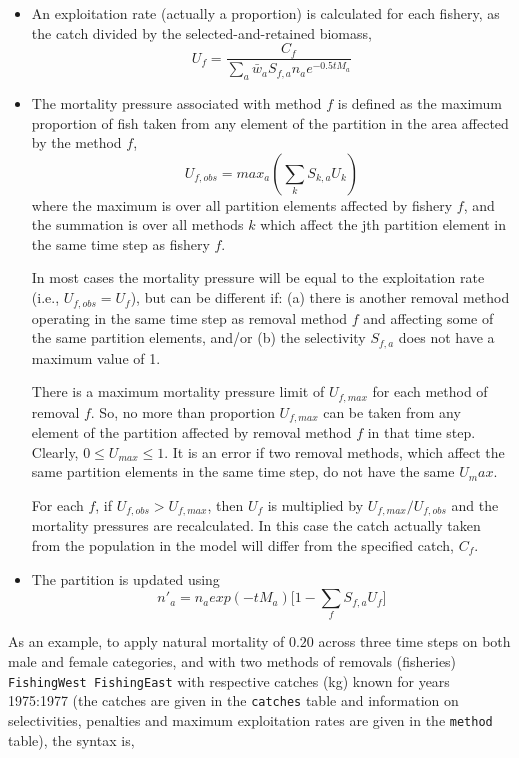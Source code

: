 \begin{itemize}
	\item An exploitation rate (actually a proportion) is calculated for each fishery, as the catch divided by the selected-and-retained biomass,
	$$ U_f = \frac{C_f}{\sum_a \bar{w}_aS_{f,a}n_a e^{-0.5tM_a}}$$
	\item The mortality pressure associated with method $f$ is defined as the maximum proportion of fish taken from any element of the partition in the area affected by the method $f$,
	$$ U_{f,obs} = max_a(\sum_k S_{k,a}U_k) $$
	where the maximum is over all partition elements affected by fishery $f$, and the summation is over all methods $k$ which affect the jth partition element in the same time step as fishery $f$.

In most cases the mortality pressure will be equal to the exploitation rate (i.e., $U_{f,obs} = U_f$), but can be different if: (a) there is another removal method operating in the same time step as removal method $f$ and affecting some of the same partition elements, and/or (b) the selectivity $S_{f,a}$ does not have a maximum value of 1.

There is a maximum mortality pressure limit of $U_{f,max}$ for each method of removal $f$. So, no more than proportion $U_{f,max}$ can be taken from any element of the partition affected by removal method $f$ in that time step. Clearly, $0 \leq U_{max} \leq 1$. It is an error if two removal methods, which affect the same partition elements in the same time step, do not have the same $U_max$.

For each $f$, if $U_{f,obs} > U_{f,max}$, then $U_f$ is multiplied by $U_{f,max}/U_{f,obs}$ and the mortality pressures are recalculated. In this case the catch actually taken from the population in the model will differ from the specified catch, $C_f$.

\item The partition is updated using
	$$ n'_a = n_a exp(-tM_a)\big[1 - \sum_f S_{f,a} U_f \big] $$
\end{itemize}

As an example, to apply natural mortality of $0.20$ across three time steps on both male and female categories, and with two methods of removals (fisheries) \texttt{FishingWest FishingEast} with respective catches (kg) known for years 1975:1977 (the catches are given in the \texttt{catches} table and information on selectivities, penalties and maximum exploitation rates are given in the \texttt{method} table), the syntax is,

